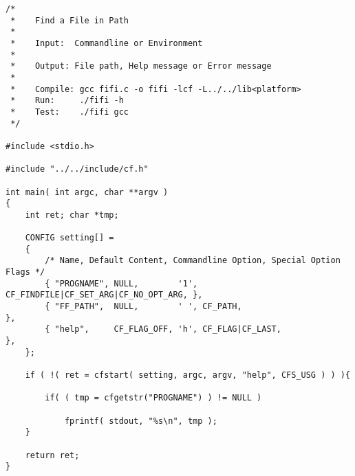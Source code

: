

\begin{DocInclude}\begin{verbatim}
/*
 *    Find a File in Path
 *
 *    Input:  Commandline or Environment
 *
 *    Output: File path, Help message or Error message
 *
 *    Compile: gcc fifi.c -o fifi -lcf -L../../lib<platform>
 *    Run:     ./fifi -h
 *    Test:    ./fifi gcc
 */

#include <stdio.h>

#include "../../include/cf.h"

int main( int argc, char **argv )
{
    int ret; char *tmp;

    CONFIG setting[] =
    {
        /* Name, Default Content, Commandline Option, Special Option Flags */
        { "PROGNAME", NULL,        '1', CF_FINDFILE|CF_SET_ARG|CF_NO_OPT_ARG, },
        { "FF_PATH",  NULL,        ' ', CF_PATH,                              },
        { "help",     CF_FLAG_OFF, 'h', CF_FLAG|CF_LAST,                      },
    };

    if ( !( ret = cfstart( setting, argc, argv, "help", CFS_USG ) ) ){

        if( ( tmp = cfgetstr("PROGNAME") ) != NULL )

            fprintf( stdout, "%s\n", tmp );
    }

    return ret;
}
\end{verbatim}
\end{DocInclude}
 